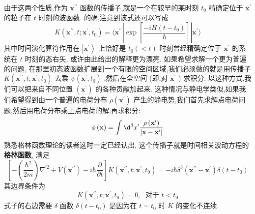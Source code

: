 由于这两个性质,作为 ${\mathbf{x}}^{\prime \prime }$ 函数的传播子,就是一个在较早的某时刻 ${t}_{0}$ 精确定位于 ${\mathbf{x}}^{\prime }$ 的粒子在 $t$ 时刻的波函数. 的确,注意到该式还可以写成
\begin{equation}
K\left( {{\mathbf{x}}^{\prime \prime }, t;{\mathbf{x}}^{\prime },{t}_{0}}\right) = \langle {{\mathbf{x}}^{\prime \prime }\left| {\exp \left\lbrack \frac{-{iH}\left( {t - {t}_{0}}\right) }{\hbar }\right\rbrack }\right| {\mathbf{x}}^{\prime }}\rangle
\end{equation}
其中时间演化算符作用在 $\left| {\mathbf{x}}^{\prime }\right\rangle$ 上恰好是 ${t}_{0}\left( { < t}\right)$ 时刻曾经精确定位于 ${\mathbf{x}}^{\prime }$ 的系统在 $t$ 时刻的态右矢, 或许由此给出的解释更为漂亮. 如果希望求解一个更为普遍的问题, 在那里初态波函数扩展到一个有限的空间区域,我们必须做的就是用传播子 $K\left( {{\mathbf{x}}^{\prime \prime }, t;{\mathbf{x}}^{\prime },{t}_{0}}\right)$ 去乘 $\psi \left( {{\mathbf{x}}^{\prime },{t}_{0}}\right)$ ,然后在全空间 (即,对 ${\mathbf{x}}^{\prime }$ ) 求积分. 以这种方式,我们可以把来自不同位置 $\left( {\mathbf{x}}^{\prime }\right)$ 的各种贡献加起来. 这种情况与静电学类似,如果我们希望得到由一个普遍的电荷分布 $\rho \left( {\mathbf{x}}^{\prime }\right)$ 产生的静电势,我们首先求解点电荷问题,然后用电荷分布乘上点电荷的解,再求积分:
\begin{equation}
\phi \left( \mathbf{x}\right) = \int {\d}^{3}{x}^{\prime }\frac{\rho \left( {\mathbf{x}}^{\prime }\right) }{\left| \mathbf{x} - {\mathbf{x}}^{\prime }\right| }
\end{equation}
熟悉格林函数理论的读者这时一定已经认出, 这个传播子就是时间相关波动方程的\textbf{格林函数}, 满足
\begin{equation}
\left\lbrack {-\left( \frac{{\hbar }^{2}}{2m}\right) {\nabla }^{\prime 2} + V\left( {\mathbf{x}}^{\prime \prime }\right) - i\hbar \frac{\partial }{\partial t}}\right\rbrack K\left( {{\mathbf{x}}^{\prime \prime }, t;{\mathbf{x}}^{\prime },{t}_{0}}\right) = - i\hbar {\delta }^{3}\left( {{\mathbf{x}}^{\prime \prime } - {\mathbf{x}}^{\prime }}\right) \delta \left( {t - {t}_{0}}\right)
\end{equation}
其边界条件为
\begin{equation}
K\left( {{\mathbf{x}}^{\prime \prime }, t;{\mathbf{x}}^{\prime },{t}_{0}}\right) = 0,\;\text{ 对于 }t < {t}_{0}
\end{equation}
式子的右边需要 $\delta$ 函数 $\delta \left( {t - {t}_{0}}\right)$ 是因为在 $t = {t}_{0}$ 时 $K$ 的变化不连续.

